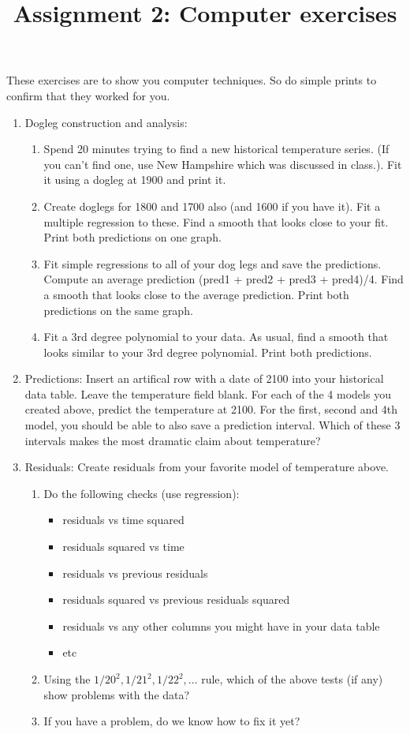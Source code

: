 \documentclass[11pt]{article}
\begin{document}
\title{Assignment 2: Computer exercises}

These exercises are to show you computer techniques.  So do simple
 prints to confirm that they worked for you.

\begin{enumerate}
\item Dogleg construction and analysis:
\begin{enumerate}
\item Spend 20 minutes trying to find a new historical temperature
series.  (If you can't find one, use New Hampshire which was discussed
in class.).   Fit it using a dogleg at 1900 and print it.
\item Create doglegs for 1800 and 1700 also (and 1600 if you have
it).  Fit a multiple regression to these.  Find a smooth that looks
close to your fit.  Print both predictions on one graph. 
\item Fit simple regressions to all of your dog legs and save the
predictions.  Compute an average prediction (pred1 + pred2 + pred3 +
pred4)/4.  Find a smooth that looks close to the average prediction.
Print both predictions on the same graph.
\item Fit a 3rd degree polynomial to your data.  As usual, find a
smooth that looks similar to your 3rd degree polynomial.  Print both
predictions. 
\end{enumerate}

\item Predictions: Insert an artifical row with a date of 2100 into
your historical data table.  Leave the temperature field blank.  For
each of the 4 models you created above, predict the temperature at
2100.   For the first, second and 4th model, you should be able to
also save a prediction interval.  Which of these 3 intervals makes the
most dramatic claim about temperature?

\item Residuals: Create residuals from your favorite model of
temperature above.  
\begin{enumerate}
\item Do the following checks (use regression):
\begin{itemize}
\item residuals vs time squared
\item residuals squared vs time
\item residuals vs previous residuals
\item residuals squared vs previous residuals squared
\item residuals vs any other columns you might have in your data table
\item etc
\end{itemize}
\item Using the $1/20^2, 1/21^2, 1/22^2,\ldots$ rule, which of the
above tests (if any) show problems with the data?
\item If you have a problem, do we know how to fix it yet?
\end{enumerate}


\end{enumerate}
\end{document}
